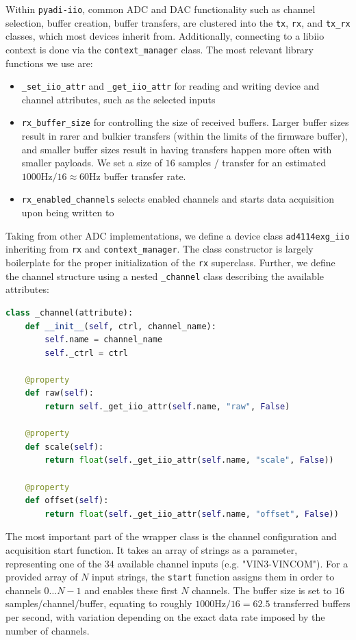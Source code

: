 \documentclass{thesis}
\newcommand{\Hz}{\unit{\hertz}}
\begin{document}
Within \texttt{pyadi-iio}, common ADC and DAC functionality such as channel selection, buffer creation, buffer transfers, are clustered into the \texttt{tx}, \texttt{rx}, and \texttt{tx\_rx} classes, which most devices inherit from. Additionally, connecting to a libiio context is done via the \texttt{context\_manager} class. The most relevant library functions we use are:
\begin{itemize}
    \item \texttt{\_set\_iio\_attr} and \texttt{\_get\_iio\_attr} for reading and writing device and channel attributes, such as the selected inputs
    \item \texttt{rx\_buffer\_size} for controlling the size of received buffers. Larger buffer sizes result in rarer and bulkier transfers (within the limits of the firmware buffer), and smaller buffer sizes result in having transfers happen more often with smaller payloads. We set a size of $16$ samples / transfer for an estimated $1000\Hz / 16 \approx 60\Hz$ buffer transfer rate.
    \item \texttt{rx\_enabled\_channels} selects enabled channels and starts data acquisition upon being written to
\end{itemize}

Taking from other ADC implementations, we define a device class \texttt{ad4114exg\_iio} inheriting from \texttt{rx} and \texttt{context\_manager}. The class constructor is largely boilerplate for the proper initialization of the \texttt{rx} superclass. Further, we define the channel structure using a nested \texttt{\_channel} class describing the available attributes:

\begin{lstlisting}[language=Python]
class _channel(attribute):
    def __init__(self, ctrl, channel_name):
        self.name = channel_name
        self._ctrl = ctrl

    @property
    def raw(self):
        return self._get_iio_attr(self.name, "raw", False)

    @property
    def scale(self):
        return float(self._get_iio_attr(self.name, "scale", False))

    @property
    def offset(self):
        return float(self._get_iio_attr(self.name, "offset", False))
\end{lstlisting}

The most important part of the wrapper class is the channel configuration and acquisition start function. It takes an array of strings as a parameter, representing one of the 34 available channel inputs (e.g. "VIN3-VINCOM"). For a provided array of $N$ input strings, the \texttt{start} function assigns them in order to channels $0\dots N-1$ and enables these first $N$ channels. The buffer size is set to $16$ samples/channel/buffer, equating to roughly $1000\Hz/16 = 62.5$ transferred buffers per second, with variation depending on the exact data rate imposed by the number of channels. 
\end{document}
